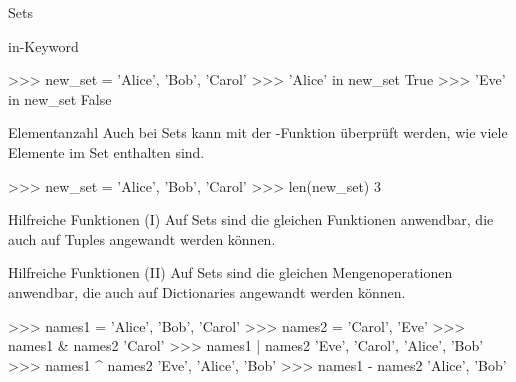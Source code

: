 \begin{subsection}{Sets}
\begin{frame}[fragile]{in-Keyword}
\begin{pyconcode}
>>> new_set = {'Alice', 'Bob', 'Carol'}
>>> 'Alice' in new_set
True
>>> 'Eve' in new_set
False
\end{pyconcode} 

    
        \end{frame}
        
        \begin{frame}[fragile]{Elementanzahl}
            Auch bei Sets kann mit der -Funktion überprüft werden, wie viele Elemente im Set enthalten sind.
                
\begin{pyconcode}
>>> new_set = {'Alice', 'Bob', 'Carol'}
>>> len(new_set)
3
\end{pyconcode} 

    
        \end{frame}
        
        \begin{frame}[fragile]{Hilfreiche Funktionen (I)}
            Auf Sets sind die gleichen Funktionen anwendbar, die auch auf Tuples angewandt werden können.
        \end{frame}
        
         \begin{frame}[fragile]{Hilfreiche Funktionen (II)}
            Auf Sets sind die gleichen Mengenoperationen anwendbar, die auch auf Dictionaries angewandt werden können.

\begin{pyconcode}
>>> names1 = {'Alice', 'Bob', 'Carol'}
>>> names2 = {'Carol', 'Eve'}
>>> names1 & names2
'Carol'
>>> names1 | names2
{'Eve', 'Carol', 'Alice', 'Bob'}
>>> names1 ^ names2
{'Eve', 'Alice', 'Bob'}
>>> names1 - names2
{'Alice', 'Bob'}
\end{pyconcode} 

    
        \end{frame}
        

\end{subsection}
